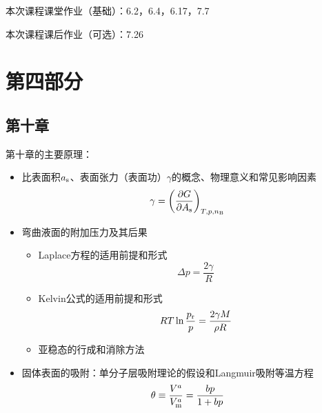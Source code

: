 \documentclass[9pt]{beamer}
\newcommand\B{{\rm B}}
\newcommand\m{{\rm m}}
\newcommand\rr{{\rm r}}
\newcommand{\s}{{\rm s}}
\begin{document}
	\begin{frame}
	
	本次课程课堂作业（基础）：6.2，6.4，6.17，7.7
	
	\hspace*{\fill}	
	
	本次课程课后作业（可选）：7.26
	
	\end{frame}		
	
	\section{第四部分}	
	
	\subsection{第十章}
	\begin{frame}
	
	第十章的主要原理：
	
	\begin{itemize}
	
	\item 比表面积$a_\s$、表面张力（表面功）$\gamma$的概念、物理意义和常见影响因素
	\[
		\gamma = \left( \frac{ \partial G }{ \partial A_\s } \right)_{T,p,n_\B}
	\]
	
	\item 弯曲液面的附加压力及其后果
		\begin{itemize}
	
		\item Laplace方程的适用前提和形式
		\[
			\Delta p = \frac{ 2\gamma }{ R }
		\]
		
		\item Kelvin公式的适用前提和形式
		\[
			RT \ln{ \frac{ p_\rr }{ p } } = \frac{ 2 \gamma M }{ \rho R }
		\]
		
		\item 亚稳态的行成和消除方法
	
		\end{itemize}
	
	\item 固体表面的吸附：单分子层吸附理论的假设和Langmuir吸附等温方程
	\[
		\theta \equiv \frac{ V^a }{ V^a_\m } = \frac{ bp }{ 1 + bp }
	\]
	
	\end{itemize}
	
	\end{frame}
	
\end{document}
